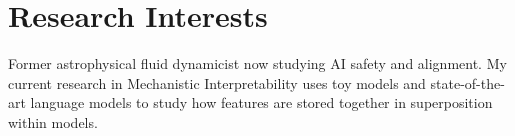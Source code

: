 \section{Research Interests}


Former astrophysical fluid dynamicist now studying AI safety and alignment.
My current research in Mechanistic Interpretability uses toy models and state-of-the-art language models to study how features are stored together in superposition within models.
